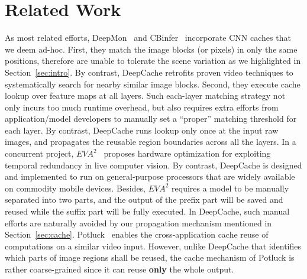 \documentclass[10pt,acmtog]{acmart}
\newcommand{\framework}{DeepCache\xspace}
\newcommand{\sys}{\framework{}}
\newcommand{\revise}[1]{{#1}}
\begin{document}
\section{Related Work}\label{sec:related}%
As most related efforts, DeepMon~\cite{conf/mobisys/LocLB17} and CBinfer~\cite{cavigelli2017cbinfer}  incorporate CNN caches that we deem ad-hoc.
First, they match the image blocks (or pixels) in only the same positions, therefore are unable to tolerate the scene variation as we highlighted in Section~\ref{sec:intro}.
By contrast, \sys{} retrofits proven video techniques to systematically search for nearby similar image blocks.
Second, 
they execute cache lookup over feature maps at all layers.
\revise{Such each-layer matching strategy not only incurs too much runtime overhead, but also requires extra efforts from application/model developers to manually set a ``proper'' matching threshold for each layer.
By contrast, \sys{} runs lookup only once at the input raw images, and propagates the reusable region boundaries across all the layers.
In a concurrent project, $EVA^2$~\cite{buckler2018eva} proposes hardware optimization for exploiting temporal redundancy in live computer vision. By contrast, \sys{} is designed and implemented to run on general-purpose processors that are widely available on commodity mobile devices.
Besides, $EVA^2$ requires a model to be manually separated into two parts, and the output of the prefix part will be saved and reused while the suffix part will be fully executed. In \sys{}, such manual efforts are naturally avoided by our propagation mechanism mentioned in Section~\ref{sec:cache}.
Potluck~\cite{guo2018potluck} enables the cross-application cache reuse of computations on a similar video input.
However, unlike \sys{} that identifies which parts of image regions shall be reused, the cache mechanism of Potluck is rather coarse-grained since it can reuse \textbf{only} the whole output.
}%
\end{document}
